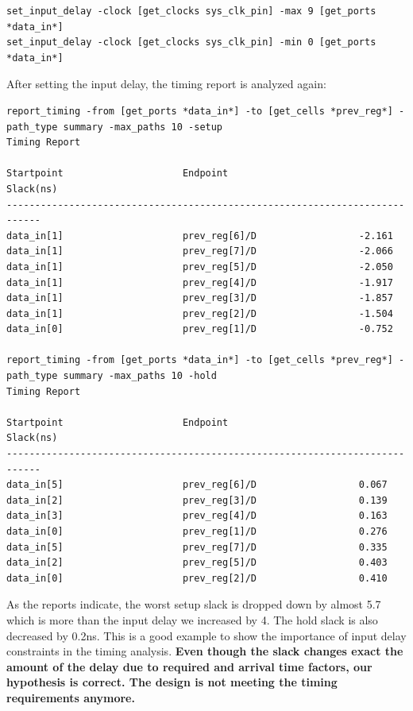 \documentclass{report}
\begin{document}
\begin{verbatim}
set_input_delay -clock [get_clocks sys_clk_pin] -max 9 [get_ports *data_in*]
set_input_delay -clock [get_clocks sys_clk_pin] -min 0 [get_ports *data_in*]
\end{verbatim}
After setting the input delay, the timing report is analyzed again:
\begin{verbatim}
report_timing -from [get_ports *data_in*] -to [get_cells *prev_reg*] -path_type summary -max_paths 10 -setup
Timing Report

Startpoint                     Endpoint                       Slack(ns)     
----------------------------------------------------------------------------
data_in[1]                     prev_reg[6]/D                  -2.161        
data_in[1]                     prev_reg[7]/D                  -2.066        
data_in[1]                     prev_reg[5]/D                  -2.050        
data_in[1]                     prev_reg[4]/D                  -1.917        
data_in[1]                     prev_reg[3]/D                  -1.857        
data_in[1]                     prev_reg[2]/D                  -1.504        
data_in[0]                     prev_reg[1]/D                  -0.752

report_timing -from [get_ports *data_in*] -to [get_cells *prev_reg*] -path_type summary -max_paths 10 -hold
Timing Report

Startpoint                     Endpoint                       Slack(ns)     
----------------------------------------------------------------------------
data_in[5]                     prev_reg[6]/D                  0.067         
data_in[2]                     prev_reg[3]/D                  0.139         
data_in[3]                     prev_reg[4]/D                  0.163         
data_in[0]                     prev_reg[1]/D                  0.276         
data_in[5]                     prev_reg[7]/D                  0.335         
data_in[2]                     prev_reg[5]/D                  0.403         
data_in[0]                     prev_reg[2]/D                  0.410
\end{verbatim}
As the reports indicate, the worst setup slack is dropped down by almost 5.7 which is more than the input delay we increased by 4. The hold slack is also decreased by 0.2ns. This is a good example to show the importance of input delay constraints in the timing analysis.
\textbf{Even though the slack changes exact the amount of the delay due to required and arrival time factors, our hypothesis is correct. The design is not meeting the timing requirements anymore.}
\end{document}
